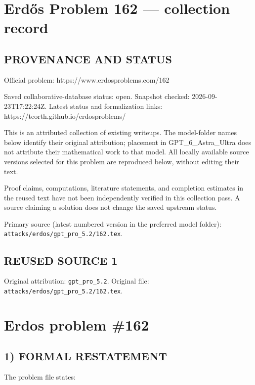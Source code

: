 \section*{Erd\H{o}s Problem 162 --- collection record}

\subsection*{PROVENANCE AND STATUS}
Official problem: https://www.erdosproblems.com/162

Saved collaborative-database status: open.
Snapshot checked: 2026-09-23T17:22:24Z.
Latest status and formalization links: https://teorth.github.io/erdosproblems/

This is an attributed collection of existing writeups. The model-folder names below identify their original attribution; placement in GPT\_6\_Astra\_Ultra does not attribute their mathematical work to that model. All locally available source versions selected for this problem are reproduced below, without editing their text.

Proof claims, computations, literature statements, and completion estimates in the reused text have not been independently verified in this collection pass. A source claiming a solution does not change the saved upstream status.

Primary source (latest numbered version in the preferred model folder): \texttt{attacks/erdos/gpt\_pro\_5.2/162.tex}.

\subsection*{REUSED SOURCE 1}
Original attribution: \texttt{gpt\_pro\_5.2}.
Original file: \texttt{attacks/erdos/gpt\_pro\_5.2/162.tex}.

\section*{Erdos problem \#162}

\subsection*{1) FORMAL RESTATEMENT}
The problem file states:

